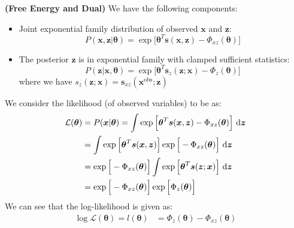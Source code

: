 \begin{remark}{\textbf{(Free Energy and Dual)}}
    We have the following components:
    \begin{itemize}
        \item Joint exponential family distribution of observed $\boldsymbol x$ and $\boldsymbol z$:
        \begin{equation*}
            P(\boldsymbol x, \boldsymbol z | \boldsymbol \theta) = \exp\Big[ \boldsymbol \theta^T\boldsymbol s(\boldsymbol x, \boldsymbol z) - \Phi_{xz}(\boldsymbol \theta) \Big]
        \end{equation*}
        \item The posterior $\boldsymbol z$ is in exponential family with clamped sufficient statistics:
        \begin{equation*}
            P(\boldsymbol z | \boldsymbol x, \boldsymbol \theta) = \exp\Big[ \boldsymbol \theta^T\boldsymbol s_z(\boldsymbol z;\boldsymbol x) - \Phi_z(\boldsymbol \theta) \Big]
        \end{equation*}
        where we have $s_z(\boldsymbol z;\boldsymbol x) = \boldsymbol s_{xz}(\boldsymbol x^\text{obs};\boldsymbol z)$
    \end{itemize}
    We consider the likelihood (of observed variables) to be as:
    \begin{equation*}
    \begin{aligned}
        \mathcal{L}(\boldsymbol \theta) 
        &= P(\boldsymbol x | \boldsymbol \theta) = \int \exp\Big[ \boldsymbol \theta^T\boldsymbol s(\boldsymbol x, \boldsymbol z) - \Phi_{xz}(\boldsymbol \theta) \Big] \ \mathrm{d} \boldsymbol z \\
        &= \int \exp\Big[ \boldsymbol \theta^T\boldsymbol s(\boldsymbol x, \boldsymbol z) \Big] \exp\Big[- \Phi_{xz}(\boldsymbol \theta) \Big]\ \mathrm{d} \boldsymbol z \\
        &= \exp\Big[- \Phi_{xz}(\boldsymbol \theta) \Big]\int \exp\Big[ \boldsymbol \theta^T\boldsymbol s(\boldsymbol z; \boldsymbol x) \Big] \ \mathrm{d} \boldsymbol z \\
        &= \exp\Big[- \Phi_{xz}(\boldsymbol \theta) \Big] \exp\Big[ \Phi_{z}(\boldsymbol \theta) \Big] \\
    \end{aligned}
    \end{equation*}
    We can see that the log-likelihood is given as:
    \begin{equation*}
    \begin{aligned}
        \log \mathcal{L}(\boldsymbol \theta) = l(\boldsymbol \theta) &= \Phi_{z}(\boldsymbol \theta) - \Phi_{xz}(\boldsymbol \theta) \\

\end{aligned}
\end{equation*}
\end{remark}
